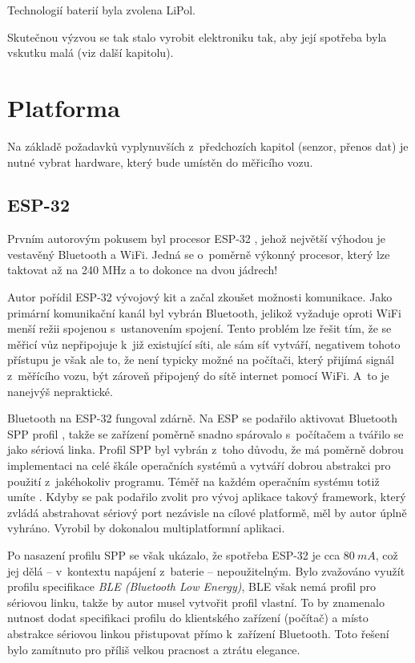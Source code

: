 Technologií baterií byla zvolena LiPol.

Skutečnou výzvou se tak stalo vyrobit elektroniku tak, aby její spotřeba
byla vskutku malá (viz další kapitolu).

\section{Platforma}
\label{sec:wsm-platforma}

Na základě požadavků vyplynuvších z~předchozích kapitol (senzor, přenos dat)
je nutné vybrat hardware, který bude umístěn do měřicího vozu.

\subsection{ESP-32}
\label{subsec:wsm-esp32}

Prvním autorovým pokusem byl procesor ESP-32 \cite{esp-32}, jehož největší
výhodou je vestavěný Bluetooth a WiFi. Jedná se o~poměrně výkonný procesor,
který lze taktovat až na 240 MHz a to dokonce na dvou jádrech!
\cite{esp-32:datasheet}

Autor pořídil ESP-32 vývojový kit a začal zkoušet možnosti komunikace. Jako
primární komunikační kanál byl vybrán Bluetooth, jelikož vyžaduje oproti
WiFi menší režii spojenou s~ustanovením spojení. Tento problém lze řešit tím,
že se měřicí vůz nepřipojuje k~již existující síti, ale sám síť vytváří,
negativem tohoto přístupu je však ale to, že není typicky možné na počítači,
který přijímá signál z~měřícího vozu, být zároveň připojený do sítě internet
pomocí WiFi. A~to je nanejvýš nepraktické.

Bluetooth na ESP-32 fungoval zdárně. Na ESP se podařilo aktivovat Bluetooth SPP
profil \cite{spp:specs}, takže se zařízení poměrně snadno spárovalo s~počítačem a
tvářilo se jako sériová linka. Profil SPP byl vybrán z~toho důvodu, že má
poměrně dobrou implementaci na celé škále operačních systémů a vytváří dobrou
abstrakci pro použití z~jakéhokoliv programu. Téměř na každém operačním systému
totiž umíte . Kdyby se pak podařilo zvolit pro vývoj
aplikace takový framework, který zvládá abstrahovat sériový port nezávisle na
cílové platformě, měl by autor úplně vyhráno. Vyrobil by dokonalou
multiplatformní aplikaci.

Po nasazení profilu SPP se však ukázalo, že spotřeba ESP-32 je cca $80\ mA$,
což jej dělá -- v~kontextu napájení z~baterie -- nepoužitelným. Bylo zvažováno
využít profilu specifikace \textit{BLE (Bluetooth Low Energy)}, BLE však nemá
profil pro sériovou linku, takže by autor musel vytvořit profil vlastní. To
by znamenalo nutnost dodat specifikaci profilu do klientského zařízení (počítač)
a místo abstrakce sériovou linkou přistupovat přímo k~zařízení Bluetooth.
Toto řešení bylo zamítnuto pro příliš velkou pracnost a ztrátu elegance.


